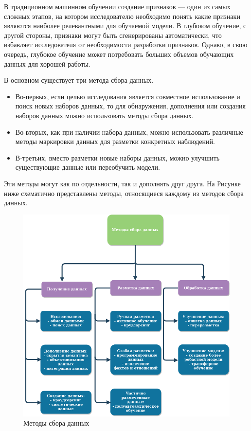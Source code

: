 \documentclass[12pt,a4paper, oneside]{extreport}
\begin{document}
В традиционном машинном обучении создание  признаков — один из самых сложных этапов, на котором исследователю  необходимо понять какие признаки являются  наиболее релевантными для обучаемой  модели. В глубоком обучение, с другой стороны,  признаки могут быть сгенерированы  автоматически, что избавляет исследователя от необходимости разработки признаков. Однако, в свою очередь, глубокое обучение может потребовать больших объемов обучающих данных для хорошей работы. 

В основном существует три метода сбора данных. 

\begin{itemize}
	\item Во-первых, если целью исследования является совместное использование и поиск новых наборов данных, то для обнаружения, дополнения или создания наборов данных можно использовать методы сбора данных. 
	\item  Во-вторых, как при наличии набора данных, можно использовать различные методы маркировки данных для разметки конкретных наблюдений. 
	\item В-третьих, вместо разметки новые наборы данных, можно улучшить существующие данные или переобучить  модели. 
\end{itemize}

Эти  методы  могут как по отдельности, так и дополнять друг друга.  На Рисунке ниже схематично представлены методы, относящиеся каждому из методов    сбора данных. 



\begin{figure}[H]
	\centering
	\includegraphics[width=1\linewidth]{"Untitled Diagram"}
	\caption{Методы сбора данных}
	\label{fig:untitled-diagram}
\end{figure}
\end{document}
